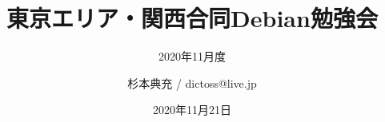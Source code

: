 \title{東京エリア・関西合同Debian勉強会}
\subtitle{2020年11月度} %
\author{杉本典充 / dictoss@live.jp}
\date{2020年11月21日}



\begin{frame}
\titlepage{}
\end{frame}



